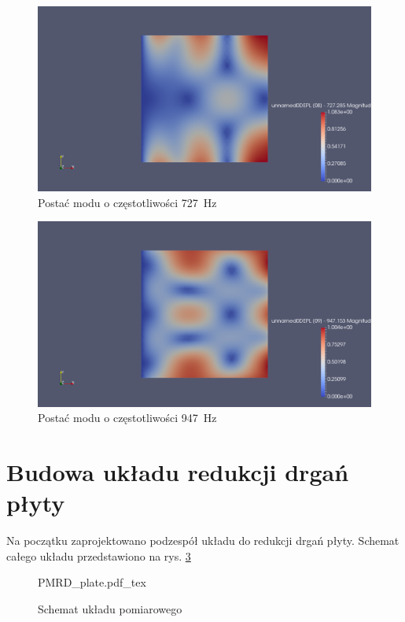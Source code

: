 \documentclass[polish,a4paper,11pt]{mwart}
\let\Oldsection\section
\renewcommand{\section}{\FloatBarrier\Oldsection}
\begin{document}
\begin{figure}[!tbh]
  \centering
  \includegraphics[width=\textwidth]{./plate_vib/727Hz.png}
  \caption{Postać modu o częstotliwości \SI{727}{\hertz}}
  \label{fig:mod4}
\end{figure}

\begin{figure}[!tbh]
  \centering
  \includegraphics[width=\textwidth]{./plate_vib/947Hz.png}
  \caption{Postać modu o częstotliwości \SI{947}{\hertz}}
  \label{fig:mod5}
\end{figure}

\section{Budowa układu redukcji drgań płyty}

Na początku zaprojektowano podzespół układu do redukcji drgań płyty. Schemat
całego układu przedstawiono na rys. \ref{fig:schemat}

\begin{figure}[!tbh]
  \centering
  {PMRD_plate.pdf_tex}
  \caption{Schemat układu pomiarowego}
  \label{fig:schemat}
\end{figure}
\end{document}
